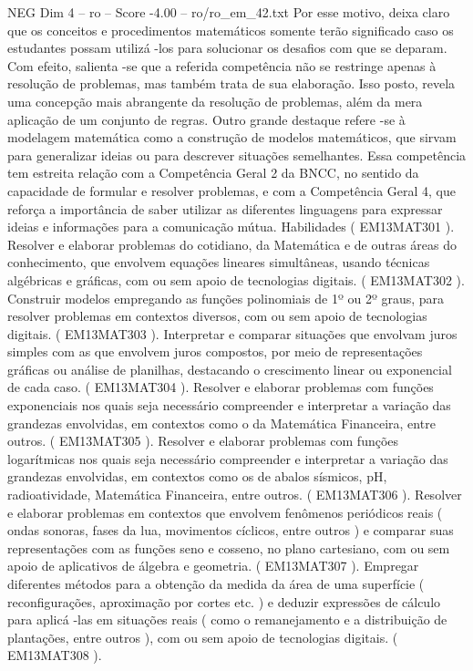 \begin{textsample}{NEG Dim 4 – ro – Score -4.00 – ro/ro\_em\_42.txt}
Por esse motivo, deixa claro que os conceitos e procedimentos matemáticos somente terão significado caso os estudantes possam utilizá -los para solucionar os desafios com que se deparam.
Com efeito, salienta -se que a referida competência não se restringe apenas à resolução de problemas, mas também trata de sua elaboração.
Isso posto, revela uma concepção mais abrangente da resolução de problemas, além da mera aplicação de um conjunto de regras.
Outro grande destaque refere -se à modelagem matemática como a construção de modelos matemáticos, que sirvam para generalizar ideias ou para descrever situações semelhantes.
Essa competência tem estreita relação com a Competência Geral 2 da BNCC, no sentido da capacidade de formular e resolver problemas, e com a Competência Geral 4, que reforça a importância de saber utilizar as diferentes linguagens para expressar ideias e informações para a comunicação mútua.
Habilidades ( EM13MAT301 ).
Resolver e elaborar problemas do cotidiano, da Matemática e de outras áreas do conhecimento, que envolvem equações lineares simultâneas, usando técnicas algébricas e gráficas, com ou sem apoio de tecnologias digitais. ( EM13MAT302 ).
Construir modelos empregando as funções polinomiais de 1º ou 2º graus, para resolver problemas em contextos diversos, com ou sem apoio de tecnologias digitais. ( EM13MAT303 ).
Interpretar e comparar situações que envolvam juros simples com as que envolvem juros compostos, por meio de representações gráficas ou análise de planilhas, destacando o crescimento linear ou exponencial de cada caso. ( EM13MAT304 ).
Resolver e elaborar problemas com funções exponenciais nos quais seja necessário compreender e interpretar a variação das grandezas envolvidas, em contextos como o da Matemática Financeira, entre outros. ( EM13MAT305 ).
Resolver e elaborar problemas com funções logarítmicas nos quais seja necessário compreender e interpretar a variação das grandezas envolvidas, em contextos como os de abalos sísmicos, pH, radioatividade, Matemática Financeira, entre outros. ( EM13MAT306 ).
Resolver e elaborar problemas em contextos que envolvem fenômenos periódicos reais ( ondas sonoras, fases da lua, movimentos cíclicos, entre outros ) e comparar suas representações com as funções seno e cosseno, no plano cartesiano, com ou sem apoio de aplicativos de álgebra e geometria. ( EM13MAT307 ).
Empregar diferentes métodos para a obtenção da medida da área de uma superfície ( reconfigurações, aproximação por cortes etc. ) e deduzir expressões de cálculo para aplicá -las em situações reais ( como o remanejamento e a distribuição de plantações, entre outros ), com ou sem apoio de tecnologias digitais. ( EM13MAT308 ).

\end{textsample}
